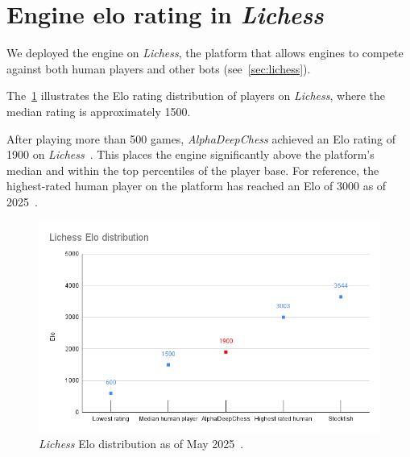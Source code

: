 \newpage

\section{Engine elo rating in \textit{Lichess}}

\noindent We deployed the engine on \textit{Lichess}, the platform that allows engines to compete against both human players and other bots (see~\cref{sec:lichess}).

\vspace{1em}

\noindent The~\cref{fig:eloDistribution} illustrates the Elo rating distribution of players on \textit{Lichess}, where the median rating is approximately 1500.
\vspace{1em}

\noindent After playing more than 500 games, \textit{AlphaDeepChess} achieved an Elo rating of 1900 on \textit{Lichess}~\cite{AlphaDeepChessElo}. This places the engine significantly above the platform's median and within the top percentiles of the player base. For reference, the highest-rated human player on the platform has reached an Elo of 3000 as of 2025~\cite{LichessBestPlayer}.

\begin{figure}[H]
    \centering
    \includegraphics[width=0.95\linewidth]{Imagenes/eloDistribution.png}
    \caption{\textit{Lichess} Elo distribution as of May 2025~\cite{LichessEloDistribution}.}\label{fig:eloDistribution}
\end{figure}